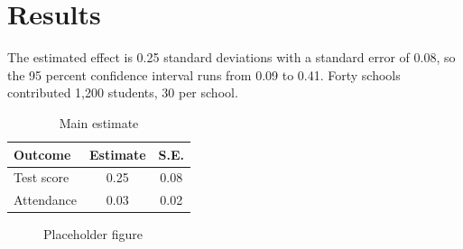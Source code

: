 \section{Results}
\label{sec:results}
The estimated effect is 0.25 standard deviations with a standard error of 0.08, so the 95 percent confidence interval runs from 0.09 to 0.41. Forty schools contributed 1,200 students, 30 per school.

\begin{table}[h]
\centering
\caption{Main estimate}
\label{tab:main}
\begin{tabular}{lcc}
\hline
Outcome & Estimate & S.E. \\
\hline
Test score & 0.25 & 0.08 \\
Attendance & 0.03 & 0.02 \\
\hline
\end{tabular}
\end{table}

\begin{figure}[h]
\centering
\caption{Placeholder figure}
\label{fig:one}
\end{figure}
